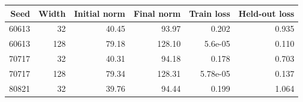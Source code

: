 \begin{tabular}{rrrrrr}
\toprule
Seed & Width & Initial norm & Final norm & Train loss & Held-out loss \\
\midrule
60613 & 32 & 40.45 & 93.97 & 0.202 & 0.935 \\
60613 & 128 & 79.18 & 128.10 & 5.6e-05 & 0.110 \\
70717 & 32 & 40.31 & 94.18 & 0.178 & 0.703 \\
70717 & 128 & 79.34 & 128.31 & 5.78e-05 & 0.137 \\
80821 & 32 & 39.76 & 94.44 & 0.199 & 1.064 \\
\bottomrule
\end{tabular}
